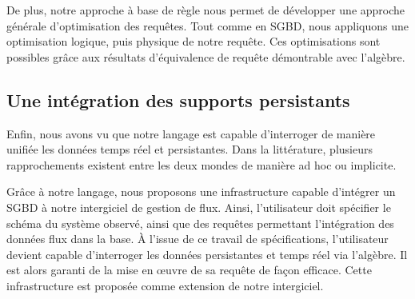 De plus, notre approche à base de règle nous permet de développer une approche générale d'optimisation des requêtes. Tout comme en SGBD, nous appliquons une optimisation logique, puis physique de notre requête. Ces optimisations sont possibles grâce aux résultats d'équivalence de requête démontrable avec l'algèbre.

\subsection{Une intégration des supports persistants}
Enfin, nous avons vu que notre langage est capable d'interroger de manière unifiée les données temps réel et persistantes. Dans la littérature, plusieurs rapprochements existent entre les deux mondes de manière ad hoc ou implicite.

Grâce à notre langage, nous proposons une infrastructure capable d'intégrer un SGBD à notre intergiciel de gestion de flux. Ainsi, l'utilisateur doit spécifier le schéma du système observé, ainsi que des requêtes permettant l'intégration des données flux dans la base. À l'issue de ce travail de spécifications, l'utilisateur devient capable d'interroger les données persistantes et temps réel via l'algèbre. Il est alors garanti de la mise en œuvre de sa requête de façon efficace. Cette infrastructure est proposée comme extension de notre intergiciel.

